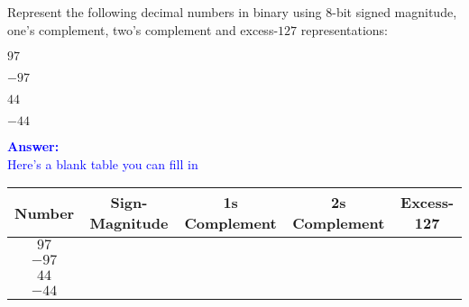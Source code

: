 \item{}
Represent the following decimal numbers in binary using $8$-bit signed
magnitude, one's complement, two's complement and excess-$127$ representations:
\begin{list}{\textbf{}}{}
    \item $97$
    \item $-97$
    \item $44$
    \item $-44$
\end{list}
\vskip12pt
\ifanswers
\textcolor{blue}{
\textbf{Answer:}\\
Here's a blank table you can fill in
\begin{tabular}{|c|c|c|c|c|}
    \hline
    {\bf Number} & {\bf Sign-Magnitude} & {\bf 1s Complement} & {\bf 2s Complement}
    & {\bf Excess-127} \\ \hline\hline
    $97$ & & & & \\ \hline
    $-97$ & & & & \\ \hline\hline
    $44$ & & & & \\ \hline
    $-44$ & & & & \\ \hline
\end{tabular}
}
\newpage
\fi
